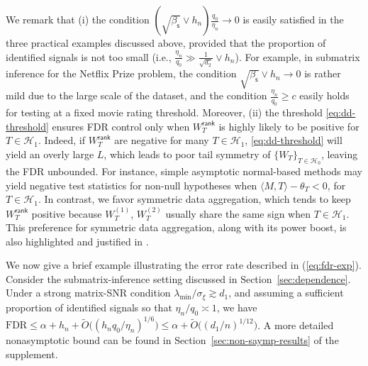 \documentclass[12pt]{article}
\newcommand{\cH}{\mathcal{H}}
\theoremstyle{plain}
\begin{document}
\begin{sloppypar}
We remark that (i) the condition $\left(\sqrt{\beta_{\mathsf{s}}} \vee h_n\right)\frac{q_0}{\eta_n} \to 0$ is easily satisfied in the three practical examples discussed above, provided that the proportion of identified signals is not too small (i.e., $\frac{\eta_n}{q_0} \gg \frac{1}{\sqrt{d_2}} \vee h_n$). For example, in submatrix inference for the Netflix Prize problem, the condition $\sqrt{\beta_{\mathsf{s}}} \vee h_n \to 0$ is rather mild due to the large scale of the dataset, and the condition $\frac{\eta_n}{q_0} \ge c$ easily holds for testing at a fixed movie rating threshold. Moreover, (ii) the threshold \eqref{eq:dd-threshold} ensures FDR control only when $W_T^{\mathsf{rank}}$ is highly likely to be positive for $T \in \cH_1$. Indeed, if $W_T^{\mathsf{rank}}$ are negative for many $T \in \cH_1$, \eqref{eq:dd-threshold} will yield an overly large $L$, which leads to poor tail symmetry of $\{W_T\}_{T\in\cH_0}$, leaving the FDR unbounded. For instance, simple asymptotic normal-based methods may yield negative test statistics for non-null hypotheses when $\langle {M}, T\rangle-\theta_T<0$, for $T\in\cH_1$. In contrast, we favor symmetric data aggregation, which tends to keep $W_T^{\mathsf{rank}}$ positive because $W_T^{(1)}$, $W_T^{(2)}$ usually share the same sign when $T \in \cH_1$. This preference for symmetric data aggregation, along with its power boost, is also highlighted and justified in \cite{dai2022false,du2021false}.

We now give a brief example illustrating the error rate described in (\ref{eq:fdr-exp}). Consider the submatrix-inference setting discussed in Section~\ref{sec:dependence}. Under a strong matrix-SNR condition $\lambda_{\min}/\sigma_{\xi}\gtrsim d_1$, and assuming a sufficient proportion of identified signals so that $\eta_n/q_0 \asymp 1$, we have $\text{FDR}\le \alpha + h_n + \widetilde{O}\big( (h_n q_0/\eta_n)^{1/6}  \big)\le \alpha + \widetilde{O} \big(  (d_1/n)^{1/12}  \big) $. A more detailed nonasymptotic bound can be found in Section~\ref{sec:non-saymp-results} of the supplement.



\end{sloppypar}
\end{document}
